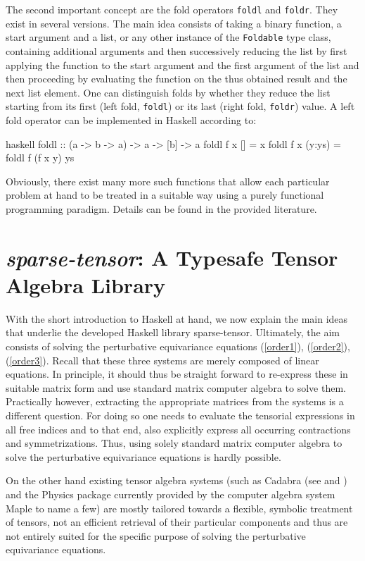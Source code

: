 The second important concept are the fold operators \texttt{foldl} and \texttt{foldr}. They exist in several versions. The main idea consists of taking a binary function, a start argument and a list, or any other instance of the \texttt{Foldable} type class, containing additional arguments and then successively reducing the list by first applying the function to the start argument and the first argument of the list and then proceeding by evaluating the function on the thus obtained result and the next list element. One can distinguish folds by whether they reduce the list starting from its first (left fold, \texttt{foldl}) or its last (right fold, \texttt{foldr}) value. A left fold operator can be implemented in Haskell according to:
\begin{center}
\begin{cminted}{haskell}
foldl :: (a -> b -> a) -> a -> [b] -> a 
foldl f x [] = x 
foldl f x (y:ys) = foldl f (f x y) ys
\end{cminted}
\end{center}
Obviously, there exist many more such functions that allow each particular problem at hand to be treated in a suitable way using a purely functional programming paradigm. Details can be found in the provided literature.

\section{\textit{sparse-tensor}: A Typesafe Tensor Algebra Library }
With the short introduction to Haskell at hand, we now explain the main ideas that underlie the developed Haskell library sparse-tensor. Ultimately, the aim consists of solving the perturbative equivariance equations (\ref{order1}), (\ref{order2}), (\ref{order3}). Recall that these three systems are merely composed of linear equations. In principle, it should thus be straight forward to re-express these in suitable matrix form and use standard matrix computer algebra to solve them. Practically however, extracting the appropriate matrices from the systems is a different question.
For doing so one needs to evaluate the tensorial expressions in all free indices and to that end, also
explicitly express all occurring contractions and symmetrizations.
Thus, using solely standard matrix computer algebra to solve the perturbative equivariance equations is hardly possible.

On the other hand existing tensor algebra systems (such as Cadabra (see \cite{cadabra1} and \cite{cadabra2}) and the Physics package \cite{MaplePhysics} currently provided by the computer algebra system Maple to name a few) are mostly tailored towards a flexible, symbolic treatment of tensors, not an efficient retrieval of their particular components and thus are not entirely suited for the specific purpose of solving the perturbative equivariance equations. 

